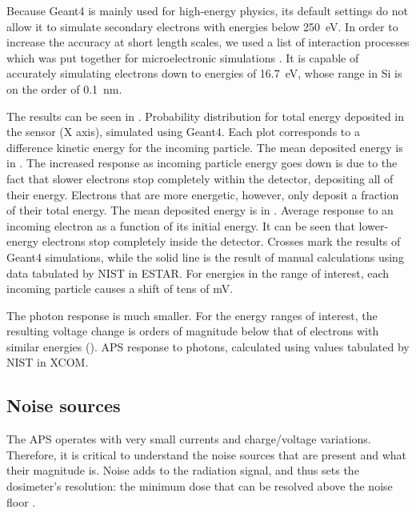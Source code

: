 Because Geant4 is mainly used for high-energy physics,
its default settings do not allow it to simulate secondary electrons with 
energies below \SI{250}{\electronvolt}.
In order to increase the accuracy at short length scales,
we used a list of interaction processes
which was put together for microelectronic simulations
\cite{Raine201497}.
It is capable of accurately simulating electrons down to energies of
\SI{16.7}{\electronvolt},
whose range in Si is on the order of \SI{0.1}{\nano\meter}.

The results can be seen in .
{Probability distribution for total energy deposited in the sensor (X axis),
simulated using Geant4.
Each plot corresponds to a difference kinetic energy for the incoming particle.
The mean deposited energy is in .}
The increased response as incoming particle energy goes down
is due to the fact that slower electrons stop completely within the detector,
depositing all of their energy.
Electrons that are more energetic, however, only deposit a fraction of their total energy.
The mean deposited energy is in .
{Average response to an incoming electron
as a function of its initial energy.
It can be seen that lower-energy electrons stop completely inside the detector.
Crosses mark the results of Geant4 simulations,
while the solid line is the result of manual calculations using
data tabulated by NIST in ESTAR\cite{berger_estar_????}.}
For energies in the range of interest,
each incoming particle causes a shift of tens of mV.

The photon response is much smaller.
For the energy ranges of interest,
the resulting voltage change
is orders of magnitude below that of electrons with similar energies
().
{APS response to photons, calculated using values tabulated by NIST in XCOM\cite{suplee_xcom_2009}.}
\subsection{Noise sources}
The APS operates with very small currents and charge/voltage variations.
Therefore, it is critical to understand the noise sources that are present
and what their magnitude is.
Noise adds to the radiation signal,
and thus sets the dosimeter's resolution:
the minimum dose that can be resolved
above the noise floor
\cite{taylor_introduction_1997}.
